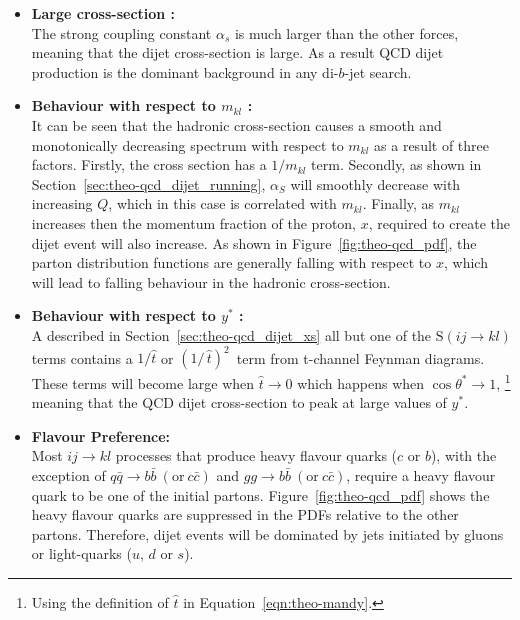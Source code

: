 \begin{itemize}[leftmargin=*]
\item\textbf{Large cross-section :}\\
  The strong coupling constant $\alpha_s$ is much larger than the other forces,
  meaning that the dijet cross-section is large.
  As a result QCD dijet production is the dominant background in any di-$b$-jet search.\vspace{0.5em}
  
\item\textbf{Behaviour with respect to $m_{kl}$ :}\\
  It can be seen that the hadronic cross-section causes
  a smooth and monotonically decreasing spectrum
  with respect to $m_{kl}$ as a result of three factors.
  Firstly, the cross section has a $1/m_{kl}$ term.
  Secondly, as shown in Section~\ref{sec:theo-qcd_dijet_running},
  $\alpha_S$ will smoothly decrease with increasing $Q$, which in this case is correlated with $m_{kl}$.
  Finally, as $m_{kl}$ increases then the momentum fraction of the proton, $x$, required to create
  the dijet event will also increase.
  As shown in Figure~\ref{fig:theo-qcd_pdf}, the parton distribution functions are generally falling 
  with respect to $x$, which will lead to falling behaviour in the hadronic cross-section.
  \vspace{0.5em}
  
\item\textbf{Behaviour with respect to $y^*$ :}\\
  A described in Section~\ref{sec:theo-qcd_dijet_xs} all but one of the $\text{S}(ij \to kl)$ terms
  contains a $1/\hat{t}$ or $(1/\,\hat{t})^2\,$ term from t-channel Feynman diagrams.
  These terms will become large when $\hat{t} \to 0$ which happens when $\cos{\theta^*} \to 1$, \footnote{Using the definition of $\hat{t}$ in Equation~\ref{eqn:theo-mandy}.}
  meaning that the QCD dijet cross-section to peak at large values of $y^*$.
  \vspace{0.5em}
  
\item\textbf{Flavour Preference:}\\
  Most $ij \to kl$ processes that produce heavy flavour quarks ($c$ or $b$),
  with the exception of $q \bar{q} \to b\bar{b} \ (\text{or}\ c\bar{c})$ and $g g \to b\bar{b} \ (\text{or}\ c\bar{c})$,
  require a heavy flavour quark to be one of the initial partons.
  Figure~\ref{fig:theo-qcd_pdf} shows the heavy flavour quarks are suppressed in the PDFs relative to the other partons.
  Therefore, dijet events will be dominated by jets initiated by gluons or light-quarks ($u$, $d$ or $s$).
 
\end{itemize}


